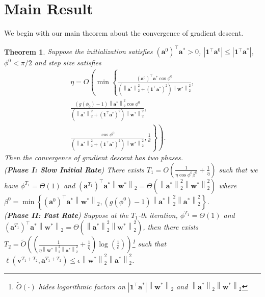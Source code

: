 \documentclass{article}
\newcommand{\firstlayer}{w}
\newcommand{\firstlayerWN}{v}
\newcommand{\secondlayer}{a}
\newcommand{\vect}[1]{\mathbf{#1}}
\newcommand{\norm}[1]{\left\|#1\right\|}
\newcommand{\abs}[1]{\left|#1\right|}
\newtheorem{thm}{Theorem}[section]
\begin{document}
\section{Main Result}
\label{sec:converge}
We begin with our main theorem about the convergence of gradient descent.
\begin{thm}\label{thm:w_norm_1_gd_converge}
Suppose the initialization satisfies $\left(\vect{\secondlayer}^0\right)^\top \vect{\secondlayer}^* > 0$, $\abs{ \vect{1}^\top\vect{\secondlayer}^0}\le \abs{\vect{1}^\top \vect{\secondlayer}^*}$, $\phi^0 <\pi/2$ and 
step size satisfies \begin{align*}
\eta = O\left( \min\left\{\frac{\left(\vect{\secondlayer}^0\right)^\top \vect{\secondlayer}^*\cos \phi^0}{\left(\norm{\vect{\secondlayer}^*}_2^2+\left(\vect{1}^\top\vect{\secondlayer}^*\right)^2\right)\norm{\vect{\firstlayer}^*}_2^2},\right.\right.\\
\left.\left.\frac{\left(g(\phi_0)-1\right)\norm{\vect{\secondlayer}^*}_2^2\cos \phi^0}{\left(\norm{\vect{\secondlayer}^*}_2^2+\left(\vect{1}^\top\vect{\secondlayer}^*\right)^2\right)\norm{\vect{\firstlayer}^*}_2^2},\right.\right.\\
\left.\left.\frac{\cos \phi^0}{\left(\norm{\vect{\secondlayer}^*}_2^2+\left(\vect{1}^\top\vect{\secondlayer}^*\right)^2\right)\norm{\vect{\firstlayer}^*}_2^2},
\frac{1}{k}\right\}\right).
\end{align*}
Then the convergence of gradient descent has two phases.\\
(\textbf{Phase I: Slow Initial Rate}) 
There exists $T_1 = O\left(\frac{1}{\eta\cos\phi^0\beta^0}+ \frac{1}{\eta}\right)$ such that  we have
$\phi^{T_1} = \Theta\left(1\right)$ and $\left(\vect{\secondlayer}^{T_1}\right)^\top \vect{\secondlayer}^*\norm{\vect{\firstlayer}^*}_2 = \Theta\left(\norm{\vect{\secondlayer}^*}_2^2\norm{\vect{\firstlayer}^*}_2^2\right)$ where $\beta^0 = \min\left\{\left(\vect{\secondlayer}^0\right)^\top \vect{\secondlayer}^*\norm{\vect{\firstlayer}^*}_2, (g(\phi^0)-1)\norm{\vect{\secondlayer}^*}_2^2\norm{\vect{\secondlayer}^*}_2^2\right\}$. \\
(\textbf{Phase II: Fast Rate}) 
Suppose at the $T_1$-th iteration, $\phi^{T_1} = \Theta\left(1\right)$ and $\left(\vect{\secondlayer}^{T_1}\right)^\top \vect{\secondlayer}^*\norm{\vect{\firstlayer}^*}_2 = \Theta\left(\norm{\vect{\secondlayer}^*}_2^2\norm{\vect{\firstlayer}^*}_2^2\right)$, then there exists $T_2 = \widetilde{O}(\left(\frac{1}{\eta\norm{\vect{\firstlayer}^*}_2^2\norm{\vect{\secondlayer}^*}_2^2 } + \frac{1}{\eta}\right)\log\left(\frac{1}{\epsilon}\right))$\footnote{$\widetilde{O}\left(\cdot\right)$ hides logarithmic factors on $\abs{\vect{1}^\top\vect{\secondlayer}^*}\norm{\vect{\firstlayer}^*}_2$ and $\norm{\vect{\secondlayer}^*}_2\norm{\vect{\firstlayer}^*}_2$} such that $\ell\left(\vect{\firstlayerWN}^{T_1+T_2},\vect{\secondlayer}^{T_1+T_2}\right) \le \epsilon\norm{\vect{\firstlayer}^*}_2^2\norm{\vect{\secondlayer}^*}_2^2$.
\end{thm}
\end{document}
